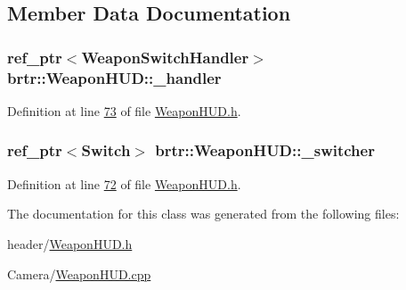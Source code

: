 \subsection{Member Data Documentation}
\hypertarget{classbrtr_1_1_weapon_h_u_d_a4ebf9d9e600e3a6b9f5d8601c084ee51}{
\subsubsection[{\+\_\+handler}]{\setlength{\rightskip}{0pt plus 5cm}ref\+\_\+ptr$<${\bf Weapon\+Switch\+Handler}$>$ brtr\+::\+Weapon\+H\+U\+D\+::\+\_\+handler\hspace{0.3cm}{\ttfamily [private]}}}\label{classbrtr_1_1_weapon_h_u_d_a4ebf9d9e600e3a6b9f5d8601c084ee51}


Definition at line \hyperlink{_weapon_h_u_d_8h_source_l00073}{73} of file \hyperlink{_weapon_h_u_d_8h_source}{Weapon\+H\+U\+D.\+h}.

\hypertarget{classbrtr_1_1_weapon_h_u_d_a32d5e498c15faa87f3bcfa83ca6c5b0e}{
\subsubsection[{\+\_\+switcher}]{\setlength{\rightskip}{0pt plus 5cm}ref\+\_\+ptr$<$Switch$>$ brtr\+::\+Weapon\+H\+U\+D\+::\+\_\+switcher\hspace{0.3cm}{\ttfamily [private]}}}\label{classbrtr_1_1_weapon_h_u_d_a32d5e498c15faa87f3bcfa83ca6c5b0e}


Definition at line \hyperlink{_weapon_h_u_d_8h_source_l00072}{72} of file \hyperlink{_weapon_h_u_d_8h_source}{Weapon\+H\+U\+D.\+h}.



The documentation for this class was generated from the following files\+:\begin{DoxyCompactItemize}
\item 
header/\hyperlink{_weapon_h_u_d_8h}{Weapon\+H\+U\+D.\+h}\item 
Camera/\hyperlink{_weapon_h_u_d_8cpp}{Weapon\+H\+U\+D.\+cpp}\end{DoxyCompactItemize}
